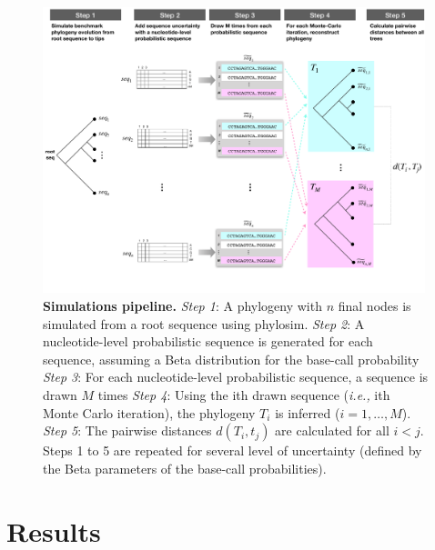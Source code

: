 \documentclass[10pt]{article}
\newcommand{\ie}{\textit{i.e.,}\xspace}
\newcommand{\nlps}{nucleotide-level probabilistic sequence\xspace}
\begin{document}
\begin{figure}[ht]
\centering
    \includegraphics[width=0.99\textwidth]{figs/pipeline.pdf}
\caption{\textbf{Simulations pipeline.} 
\textit{Step 1}: A phylogeny with $n$ final nodes is simulated from a root sequence using \textsf{phylosim}.
\textit{Step 2}: A \nlps is generated for each sequence, assuming a Beta distribution for the base-call probability
\textit{Step 3}: For each \nlps, a sequence is drawn $M$ times
\textit{Step 4}: Using the ith drawn sequence (\ie ith Monte Carlo iteration), the phylogeny $T_i$ is inferred ($i=1,\ldots,M$). 
\textit{Step 5}: The pairwise distances $d(T_i, t_j)$ are calculated for all $i<j$.
Steps 1 to 5 are repeated for several level of uncertainty (defined by the Beta parameters of the base-call probabilities).
}
\label{fig:pipeline}
\end{figure}









\section{Results}

\newpage

\end{document}
